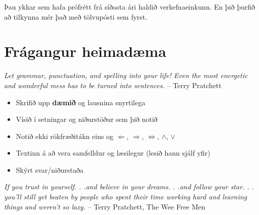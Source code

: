 \documentclass[letterpaper,10pt,icelandic]{sphinxmanual}
\begin{document}
Þau ykkar sem hafa prófrétt frá síðasta ári haldið verkefnaeinkunn. En þið þurfið að tilkynna mér það með tölvupósti sem fyrst.


\section{Frágangur heimadæma}
\label{vidauki:fragangur-heimadaema}
\emph{Let grammar, punctuation, and spelling into your life! Even the most energetic and wonderful mess has to be turned into sentences.}
-- Terry Pratchett
\begin{itemize}
\item {} 
Skrifið upp \textbf{dæmið} og lausnina snyrtilega

\item {} 
Vísið í setningar og niðurstöður sem þið notið

\item {} 
Notið ekki rökfræðitákn eins og \(\Leftarrow\), \(\Rightarrow\), \(\Leftrightarrow\), \(\wedge\), \(\vee\)

\item {} 
Textinn á að vera samfelldur og læsilegur (lesið hann sjálf yfir)

\item {} 
Skýrt svar/niðurstaða

\end{itemize}

\emph{If you trust in yourself. . .and believe in your dreams. . .and follow your star. . . you'll still get beaten by people who spent their time working hard and learning things and weren't so lazy.}
-- Terry Pratchett, The Wee Free Men
\end{document}
